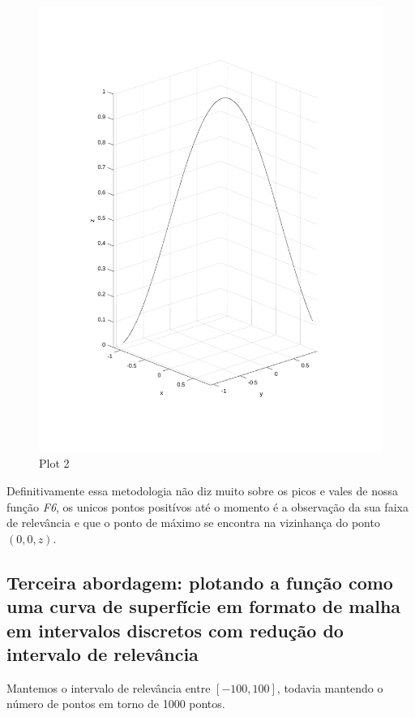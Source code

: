 \documentclass{article}
\begin{document}
\newpage
\begin{figure}[h!]
\centering
\includegraphics[scale=.5]{images/myplot2.pdf}
\caption{Plot 2}
\label{fig:plot2_f6}
\end{figure}

Definitivamente essa metodologia não diz muito sobre os picos e
vales de nossa função \emph{F6}, os unicos pontos positívos até
o momento é a observação da sua faixa de relevância e que o
ponto de máximo se encontra na vizinhança do ponto $(0,0,z)$.

\newpage
\subsection*{Terceira abordagem: plotando a função como uma curva de superfície em formato de malha em intervalos discretos com redução do intervalo de relevância}

Mantemos o intervalo de relevância entre $[-100,100]$, todavia mantendo o número de pontos em torno de 1000 pontos.
\end{document}
